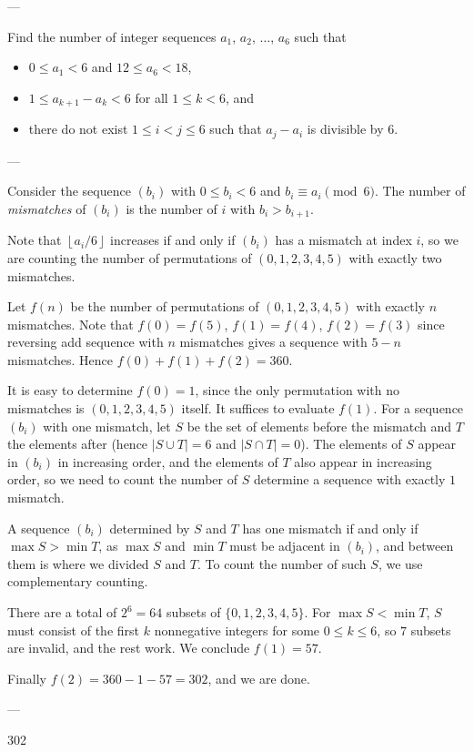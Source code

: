 
---

Find the number of integer sequences $a_1$, $a_2$, $\ldots$, $a_6$ such that
\begin{itemize}
    \item $0\le a_1<6$ and $12\le a_6<18$,
    \item $1\le a_{k+1}-a_k<6$ for all $1\le k<6$, and
    \item there do not exist $1\le i<j\le6$ such that $a_j-a_i$ is divisible by $6$.
\end{itemize} 

---

Consider the sequence $(b_i)$ with $0\le b_i<6$ and $b_i\equiv a_i\pmod6$. The number of \emph{mismatches} of $(b_i)$ is the number of $i$ with $b_i>b_{i+1}$.

Note that $\left\lfloor a_i/6\right\rfloor$ increases if and only if $(b_i)$ has a mismatch at index $i$, so we are counting the number of permutations of $(0,1,2,3,4,5)$ with exactly two mismatches.

Let $f(n)$ be the number of permutations of $(0,1,2,3,4,5)$ with exactly $n$ mismatches. Note that $f(0)=f(5)$, $f(1)=f(4)$, $f(2)=f(3)$ since reversing add sequence with $n$ mismatches gives a sequence with $5-n$ mismatches. Hence $f(0)+f(1)+f(2)=360$.

It is easy to determine $f(0)=1$, since the only permutation with no mismatches is $(0,1,2,3,4,5)$ itself. It suffices to evaluate $f(1)$. For a sequence $(b_i)$ with one mismatch, let $S$ be the set of elements before the mismatch and $T$ the elements after (hence $|S\cup T|=6$ and $|S\cap T|=0$). The elements of $S$ appear in $(b_i)$ in increasing order, and the elements of $T$ also appear in increasing order, so we need to count the number of $S$ determine a sequence with exactly $1$ mismatch.

A sequence $(b_i)$ determined by $S$ and $T$ has one mismatch if and only if $\max S>\min T$, as $\max S$ and $\min T$ must be adjacent in $(b_i)$, and between them is where we divided $S$ and $T$. To count the number of such $S$, we use complementary counting.

There are a total of $2^6=64$ subsets of $\{0,1,2,3,4,5\}$. For $\max S<\min T$, $S$ must consist of the first $k$ nonnegative integers for some $0\le k\le6$, so $7$ subsets are invalid, and the rest work. We conclude $f(1)=57$.

Finally $f(2)=360-1-57=302$, and we are done.

---

302
